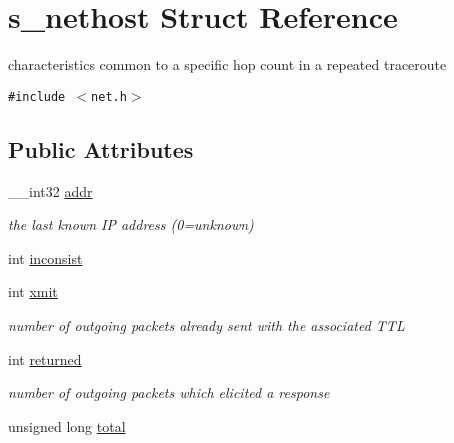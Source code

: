 \hypertarget{structs__nethost}{
\section{s\_\-nethost Struct Reference}
\label{structs__nethost}
}
characteristics common to a specific hop count in a repeated traceroute  


{\tt \#include $<$net.h$>$}

\subsection*{Public Attributes}
\begin{CompactItemize}
\item 
\hypertarget{structs__nethost_a4cc3fb1c98245d2ec001d0f0e1b4c59}{
\_\-\_\-int32 \hyperlink{structs__nethost_a4cc3fb1c98245d2ec001d0f0e1b4c59}{addr}}
\label{structs__nethost_a4cc3fb1c98245d2ec001d0f0e1b4c59}

\begin{CompactList}\small\item\em the last known IP address (0=unknown) \item\end{CompactList}\item 
int \hyperlink{structs__nethost_badb6cdfcc0c2350885aa95b47aa7e68}{inconsist}
\item 
\hypertarget{structs__nethost_8cdffb89972f526b0c55067e0020b26d}{
int \hyperlink{structs__nethost_8cdffb89972f526b0c55067e0020b26d}{xmit}}
\label{structs__nethost_8cdffb89972f526b0c55067e0020b26d}

\begin{CompactList}\small\item\em number of outgoing packets already sent with the associated TTL \item\end{CompactList}\item 
\hypertarget{structs__nethost_0b6bb2ffc189fb7206a4c34a518d9150}{
int \hyperlink{structs__nethost_0b6bb2ffc189fb7206a4c34a518d9150}{returned}}
\label{structs__nethost_0b6bb2ffc189fb7206a4c34a518d9150}

\begin{CompactList}\small\item\em number of outgoing packets which elicited a response \item\end{CompactList}\item 
\hypertarget{structs__nethost_7265e41bd1c39f0ba1dd948339c5aced}{
unsigned long \hyperlink{structs__nethost_7265e41bd1c39f0ba1dd948339c5aced}{total}}
\label{structs__nethost_7265e41bd1c39f0ba1dd948339c5aced}


\end{CompactItemize}
